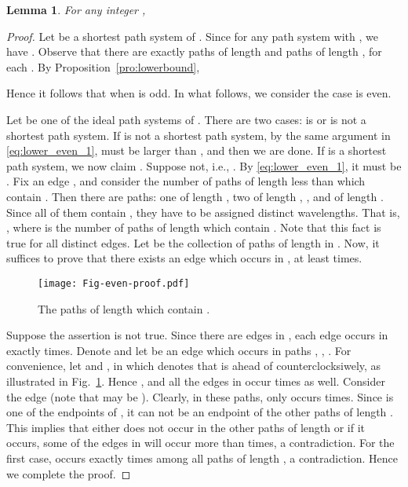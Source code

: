 \documentclass[journal,draftcls,onecolumn,12pt,twoside]{IEEEtran}
\newtheorem{lemma}[theorem]{\bf Lemma}
\begin{document}
\begin{lemma}\label{lemma:cycle_even_lower}
For any integer , 
\end{lemma}
\begin{proof}
Let  be a shortest path system of .
Since  for any path system  with , we have .
Observe that there are exactly  paths of length  and  paths of length , for each . 
By Proposition~\ref{pro:lowerbound}, 

Hence it follows that  when  is odd.
In what follows, we consider the case  is even.

Let  be one of the ideal path systems of .
There are two cases:  is or is not a shortest path system.
If  is not a shortest path system, by the same argument in \eqref{eq:lower_even_1},  must be larger than , and then we are done.
If  is a shortest path system, we now claim .
Suppose not, i.e., .
By \eqref{eq:lower_even_1}, it must be .
Fix an edge , and consider the number of paths of length less than  which contain .
Then there are  paths: one of length , two of length , , and  of length .
Since all of them contain , they have to be assigned distinct wavelengths.
That is, , where  is the number of paths of length  which contain .
Note that this fact is true for all distinct edges.
Let  be the collection of  paths of length  in .
Now, it suffices to prove that there exists an edge which occurs in , at least  times.

\begin{figure}[h]
\centering
\texttt{[image: Fig-even-proof.pdf]}
\caption{The  paths of length  which contain .} 
\label{fig:even-proof}
\end{figure}

Suppose the assertion is not true.
Since there are  edges in , each edge occurs in  exactly  times.
Denote  and let  be an edge which occurs in paths , , .
For convenience, let  and , in which  denotes that  is ahead of  counterclocksiwely, as illustrated in Fig.~\ref{fig:even-proof}.
Hence , and all the edges in  occur  times as well.
Consider the edge  (note that  may be ).
Clearly, in these  paths,  only occurs  times.
Since  is one of the endpoints of , it can not be an endpoint of the other paths of length .
This implies that either  does not occur in the other paths of length  or if it occurs, some of the edges in  will occur more than  times, a contradiction.
For the first case,  occurs exactly  times among all paths of length , a contradiction.
Hence we complete the proof.
\end{proof}
\end{document}
